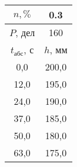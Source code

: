 \begin{tabular}[t]{|c|c|}
\hline
$n, \%$ & 0.3 \\
\hline
$P$, дел & 160 \\
\hline
$t_{абс}$, с & $h$, мм \\ 
\hline
0,0 & 200,0 \\ 
12,0 & 195,0 \\ 
24,0 & 190,0 \\ 
37,0 & 185,0 \\ 
50,0 & 180,0 \\ 
63,0 & 175,0 \\ 
\hline
\end{tabular}